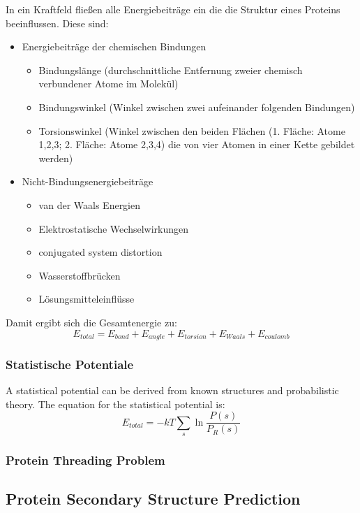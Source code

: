 \documentclass
[
   draft,     %
   paper=a4,%
   paper=portrait, %
   pagesize=auto, %
   fontsize=11pt,%
   abstract=true, %
   titlepage=true %
 ]
 {scrartcl}
\begin{document}
In ein Kraftfeld fließen alle Energiebeiträge ein die die Struktur eines Proteins beeinflussen. Diese sind:
\begin{itemize}
\item Energiebeiträge der chemischen Bindungen
\begin{itemize}
\item Bindungslänge (durchschnittliche Entfernung zweier chemisch verbundener Atome im Molekül)
\item Bindungswinkel (Winkel zwischen zwei aufeinander folgenden Bindungen)
\item Torsionswinkel (Winkel zwischen den beiden Flächen (1. Fläche: Atome 1,2,3; 2. Fläche: Atome 2,3,4) die von vier Atomen in einer Kette gebildet werden)
\end{itemize}
\item Nicht-Bindungsenergiebeiträge
\begin{itemize}
\item van der Waals Energien
\item Elektrostatische Wechselwirkungen
\item conjugated system distortion
\item Wasserstoffbrücken
\item Lösungsmitteleinflüsse
\end{itemize}
\end{itemize}
Damit ergibt sich die Gesamtenergie zu:
\begin{equation}
E_{total} = E_{bond} + E_{angle} + E_{torsion} + E_{Waals} + E_{coulomb}
\end{equation}


\subsubsection{Statistische Potentiale}
A statistical potential can be derived from known structures and probabilistic theory. The equation for the statistical potential is:
\begin{equation}
E_{total} = −kT \underset{s}{\sum} \ln \frac{P(s)}{P_R(s)}
\end{equation}


\subsubsection{Protein Threading Problem}


\subsection{Protein Secondary Structure Prediction}
\end{document}

